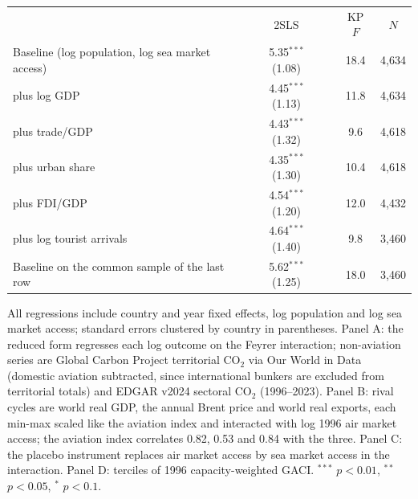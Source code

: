 \begin{table}[htbp]
\begin{threeparttable}
\begin{tabular}{lcccc}
 & 2SLS & & KP $F$ & $N$ \\
  Baseline (log population, log sea market access) & 5.35$^{***}$ (1.08) & & 18.4 & 4,634 \\
  \quad plus log GDP & 4.45$^{***}$ (1.13) & & 11.8 & 4,634 \\
  \quad plus trade/GDP & 4.43$^{***}$ (1.32) & & 9.6 & 4,618 \\
  \quad plus urban share & 4.35$^{***}$ (1.30) & & 10.4 & 4,618 \\
  \quad plus FDI/GDP & 4.54$^{***}$ (1.20) & & 12.0 & 4,432 \\
  \quad plus log tourist arrivals & 4.64$^{***}$ (1.40) & & 9.8 & 3,460 \\
  Baseline on the common sample of the last row & 5.62$^{***}$ (1.25) & & 18.0 & 3,460 \\
\bottomrule
\end{tabular}
\begin{tablenotes}\scriptsize
\item All regressions include country and year fixed effects, log population and log sea market access; standard errors clustered by country in parentheses. Panel A: the reduced form regresses each log outcome on the Feyrer interaction; non-aviation series are Global Carbon Project territorial CO$_2$ via Our World in Data (domestic aviation subtracted, since international bunkers are excluded from territorial totals) and EDGAR v2024 sectoral CO$_2$ (1996--2023). Panel B: rival cycles are world real GDP, the annual Brent price and world real exports, each min-max scaled like the aviation index and interacted with log 1996 air market access; the aviation index correlates 0.82, 0.53 and 0.84 with the three. Panel C: the placebo instrument replaces air market access by sea market access in the interaction. Panel D: terciles of 1996 capacity-weighted GACI. $^{***}$ $p<0.01$, $^{**}$ $p<0.05$, $^{*}$ $p<0.1$.
\end{tablenotes}
\end{threeparttable}
\end{table}

